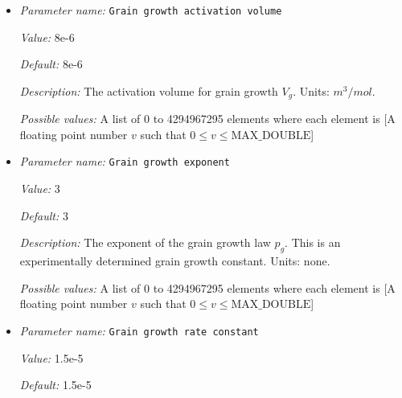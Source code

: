\begin{itemize}
{\it Description:} The activation energy for grain growth $E_g$. Units: $J/mol$.


{\it Possible values:} A list of 0 to 4294967295 elements where each element is [A floating point number $v$ such that $0 \leq v \leq \text{MAX\_DOUBLE}$]
\item {\it Parameter name:} {\tt Grain growth activation volume}
\label{parameters:Material model/Grain size model/Grain growth activation volume}
\label{parameters:Material_20model/Grain_20size_20model/Grain_20growth_20activation_20volume}


{\it Value:} 8e-6


{\it Default:} 8e-6


{\it Description:} The activation volume for grain growth $V_g$. Units: $m^3/mol$.


{\it Possible values:} A list of 0 to 4294967295 elements where each element is [A floating point number $v$ such that $0 \leq v \leq \text{MAX\_DOUBLE}$]
\item {\it Parameter name:} {\tt Grain growth exponent}
\label{parameters:Material model/Grain size model/Grain growth exponent}
\label{parameters:Material_20model/Grain_20size_20model/Grain_20growth_20exponent}


{\it Value:} 3


{\it Default:} 3


{\it Description:} The exponent of the grain growth law $p_g$. This is an experimentally determined grain growth constant. Units: none.


{\it Possible values:} A list of 0 to 4294967295 elements where each element is [A floating point number $v$ such that $0 \leq v \leq \text{MAX\_DOUBLE}$]
\item {\it Parameter name:} {\tt Grain growth rate constant}
\label{parameters:Material model/Grain size model/Grain growth rate constant}
\label{parameters:Material_20model/Grain_20size_20model/Grain_20growth_20rate_20constant}


{\it Value:} 1.5e-5


{\it Default:} 1.5e-5



\end{itemize}
